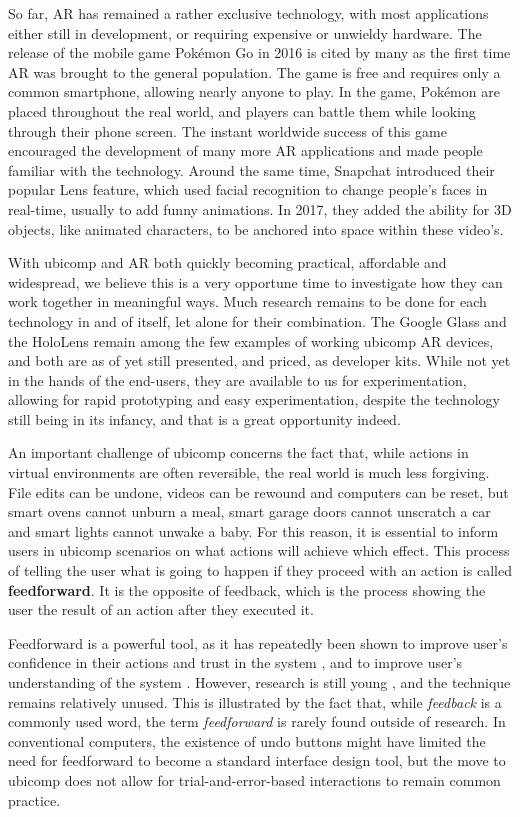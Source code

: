 So far, AR has remained a rather exclusive technology, with most applications either still in development, or requiring expensive or unwieldy hardware. The release of the mobile game Pokémon Go in 2016 is cited by many as the first time AR was brought to the general population. The game is free and requires only a common smartphone, allowing nearly anyone to play. In the game, Pokémon are placed throughout the real world, and players can battle them while looking through their phone screen. The instant worldwide success of this game encouraged the development of many more AR applications and made people familiar with the technology. Around the same time, Snapchat introduced their popular Lens feature, which used facial recognition to change people's faces in real-time, usually to add funny animations. In 2017, they added the ability for 3D objects, like animated characters, to be anchored into space within these video's.

With ubicomp and AR both quickly becoming practical, affordable and widespread, we believe this is a very opportune time to investigate how they can work together in meaningful ways. Much research remains to be done for each technology in and of itself, let alone for their combination. The Google Glass and the HoloLens remain among the few examples of working ubicomp AR devices, and both are as of yet still presented, and priced, as developer kits. While not yet in the hands of the end-users, they are available to us for experimentation, allowing for rapid prototyping and easy experimentation, despite the technology still being in its infancy, and that is a great opportunity indeed.

An important challenge of ubicomp concerns the fact that, while actions in virtual environments are often reversible, the real world is much less forgiving. File edits can be undone, videos can be rewound and computers can be reset, but smart ovens cannot unburn a meal, smart garage doors cannot unscratch a car and smart lights cannot unwake a baby. For this reason, it is essential to inform users in ubicomp scenarios on what actions will achieve which effect. This process of telling the user what is going to happen if they proceed with an action is called \textbf{feedforward}. It is the opposite of feedback, which is the process showing the user the result of an action after they executed it.

Feedforward is a powerful tool, as it has repeatedly been shown to improve user's confidence in their actions and trust in the system \cite{vermeulen2009bet, park2014previewable}, and to improve user's understanding of the system \cite{bau2008octopocus, vermeulen2009bet, vermeulen2012understanding, vermeulen2013intelligibility}. However, research is still young \cite{vermeulen2013crossing}, and the technique remains relatively unused. This is illustrated by the fact that, while \textit{feedback} is a commonly used word, the term \textit{feedforward} is rarely found outside of research. In conventional computers, the existence of undo buttons might have limited the need for feedforward to become a standard interface design tool, but the move to ubicomp does not allow for trial-and-error-based interactions to remain common practice.

